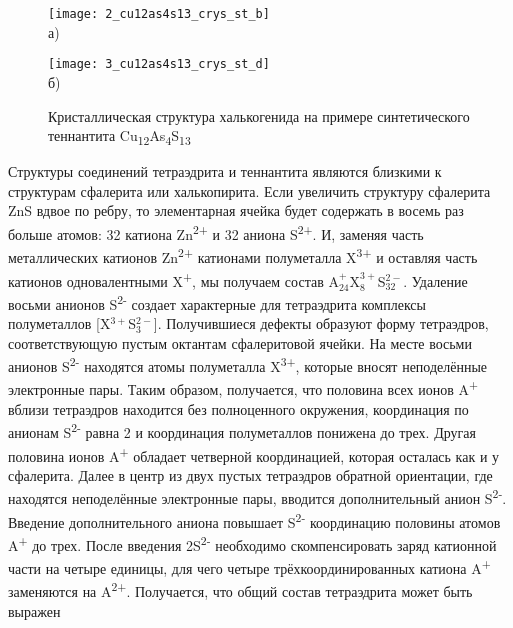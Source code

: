 \begin{figure}[pt!]
  \begin{minipage}[ht]{0.99\linewidth}\centering
    \texttt{[image: 2\_cu12as4s13\_crys\_st\_b]} \\ а)
  \end{minipage}
  \vfill
  \begin{minipage}[ht]{0.99\linewidth}\centering
    \texttt{[image: 3\_cu12as4s13\_crys\_st\_d]} \\ б)
  \end{minipage}

      \caption[Кристаллическая структура халькогенида на примере синтетического теннантита Cu\textsubscript{12}As\textsubscript{4}S\textsubscript{13}]{Кристаллическая структура халькогенида на примере синтетического теннантита Cu\textsubscript{12}As\textsubscript{4}S\textsubscript{13}}
    \label{img:figure1}
\end{figure}

Структуры соединений тетраэдрита и теннантита являются близкими к структурам сфалерита или халькопирита\cite{Pauling1934}.
Если увеличить структуру сфалерита ZnS вдвое по ребру, то элементарная ячейка будет содержать в восемь раз больше атомов: 32 катиона Zn\textsuperscript{2+} и 32 аниона S\textsuperscript{2+}. И, заменяя часть металлических катионов Zn\textsuperscript{2+} катионами полуметалла X\textsuperscript{3+} и оставляя часть катионов одновалентными X\textsuperscript{+}, мы получаем состав A$^{+}_{24}$X$^{3+}_{8}$S$^{2-}_{32}$. Удаление восьми анионов S\textsuperscript{2-} создает характерные для тетраэдрита комплексы полуметаллов [X$^{3+}$S$^{2-}_{3}$]. Получившиеся дефекты образуют форму тетраэдров, соответствующую пустым октантам сфалеритовой ячейки. На месте восьми анионов S\textsuperscript{2-} находятся атомы полуметалла  X\textsuperscript{3+}, которые вносят  неподелённые электронные пары. Таким образом, получается, что половина всех ионов A\textsuperscript{+} вблизи тетраэдров находится без полноценного окружения, координация по анионам S\textsuperscript{2-} равна 2 и координация полуметаллов понижена до трех. Другая половина ионов A\textsuperscript{+} обладает четверной координацией, которая осталась как и у сфалерита. Далее в центр из двух пустых тетраэдров обратной ориентации, где находятся неподелённые электронные пары, вводится дополнительный анион S\textsuperscript{2-}. Введение дополнительного аниона повышает S\textsuperscript{2-}  координацию половины атомов A\textsuperscript{+} до трех. После введения 2S\textsuperscript{2-} необходимо скомпенсировать заряд катионной части на четыре единицы, для чего четыре трёхкоординированных катиона A\textsuperscript{+} заменяются на A\textsuperscript{2+}. Получается, что общий состав тетраэдрита может быть выражен

